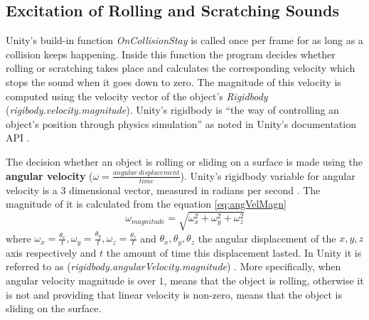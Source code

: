 
\subsection{Excitation of Rolling and Scratching Sounds}
Unity's build-in function \textit{OnCollisionStay} \cite{bib:unity_doc} is called once per frame for as long as a collision keeps happening. Inside this function the program decides whether rolling or scratching takes place and calculates the corresponding velocity which stops the sound when it goes down to zero. The magnitude of this velocity is computed using the velocity vector of the object's \textit{Rigidbody} (\textit{rigibody.velocity.magnitude}). Unity's rigidbody is ``the way of controlling an object's position through physics simulation'' as noted in Unity's documentation API \cite{bib:unity_doc}.

The decision whether an object is rolling or sliding on a surface is made using the \textbf{angular velocity} ($\omega = \frac{angular\ displacement}{time}$). Unity's rigidbody variable for angular velocity is a 3 dimensional vector, measured in radians per second \cite{bib:unity_doc}. The magnitude of it is calculated from the equation \ref{eq:angVelMagn}
\begin{equation}\label{eq:angVelMagn}
\omega_{magnitude} = \sqrt{\omega_x^2+\omega_y^2+\omega_z^2}
\end{equation}
where $\omega_x = \frac{\theta_x}{t}, \omega_y = \frac{\theta_y}{t}, \omega_z = \frac{\theta_z}{t}$ and $\theta_x, \theta_y, \theta_z$ the angular displacement of the $x, y, z$ axis respectively and $t$ the amount of time this displacement lasted. In Unity it is referred to as (\textit{rigidbody.angularVelocity.magnitude}) \cite{bib:unity_doc}. More specifically, when angular velocity magnitude is over $1$, means that the object is rolling, otherwise it is not and providing that linear velocity is non-zero, means that the object is sliding on the surface. 







